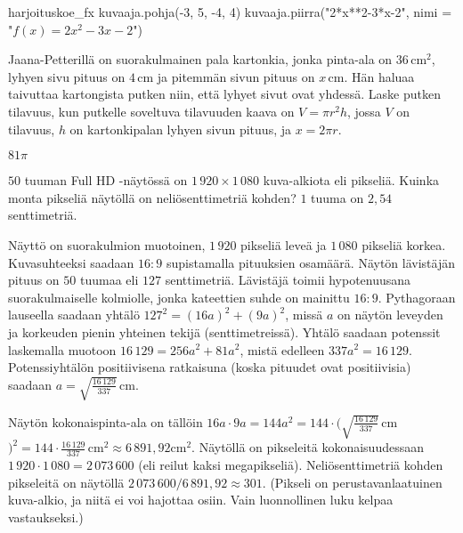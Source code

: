 \begin{luoKuva}{harjoituskoe_fx}
    kuvaaja.pohja(-3, 5, -4, 4)
    kuvaaja.piirra("2*x**2-3*x-2", nimi = "$f(x)=2x^2-3x-2$")
\end{luoKuva}

\begin{tehtava}
	\begin{vastaus}
	\end{vastaus}
		\begin{center}
			\naytaKuva{harjoituskoe_fx}
		\end{center}
\end{tehtava}

\begin{tehtava}
Jaana-Petterillä on suorakulmainen pala kartonkia, jonka pinta-ala on $36$\,cm$^2$, lyhyen sivu pituus on $4$\,cm ja pitemmän sivun pituus on $x$\,cm. Hän haluaa taivuttaa kartongista putken niin, että lyhyet sivut ovat yhdessä. Laske putken tilavuus, kun putkelle soveltuva tilavuuden kaava on $V=\pi r^2 h$, jossa $V$ on tilavuus, $h$ on kartonkipalan lyhyen sivun pituus, ja $x=2\pi r$.    
\begin{vastaus}
 $81\pi$
\end{vastaus}
\end{tehtava}

\begin{tehtava}
$50$ tuuman Full HD -näytössä on $1\,920\times1\,080$ kuva-alkiota eli pikseliä. Kuinka monta pikseliä näytöllä on neliösenttimetriä kohden? $1$ tuuma on $2,54$ senttimetriä.
	\begin{vastaus}
Näyttö on suorakulmion muotoinen, $1\,920$ pikseliä leveä ja $1\,080$ pikseliä korkea. Kuvasuhteeksi saadaan $16:9$ supistamalla pituuksien osamäärä. Näytön lävistäjän pituus on $50$ tuumaa eli $127$ senttimetriä. Lävistäjä toimii hypotenuusana suorakulmaiselle kolmiolle, jonka kateettien suhde on mainittu $16:9$. Pythagoraan lauseella saadaan yhtälö $127^2=(16a)^2+(9a)^2$, missä $a$ on näytön leveyden ja korkeuden pienin yhteinen tekijä (senttimetreissä). Yhtälö saadaan potenssit laskemalla muotoon $16\,129=256a^2+81a^2$, mistä edelleen $337a^2=16\,129$. Potenssiyhtälön positiivisena ratkaisuna (koska pituudet ovat positiivisia) saadaan $a=\sqrt{\frac{16\,129}{337}}$\,cm.

Näytön kokonaispinta-ala on tällöin $16a\cdot 9a=144a^2=144\cdot (\sqrt{\frac{16\,129}{337}}$\,cm$)^2=144\cdot\frac{16\,129}{337}$\,cm$^2\approx 6\,891,92$cm$^2$. Näytöllä on pikseleitä kokonaisuudessaan $1\,920\cdot 1\,080=2\,073\,600$ (eli reilut kaksi megapikseliä). Neliösenttimetriä kohden pikseleitä on näytöllä $2\,073\,600/6\,891,92 \approx 301$. (Pikseli on perustavanlaatuinen kuva-alkio, ja niitä ei voi hajottaa osiin. Vain luonnollinen luku kelpaa vastaukseksi.)
	\end{vastaus}
\end{tehtava}

